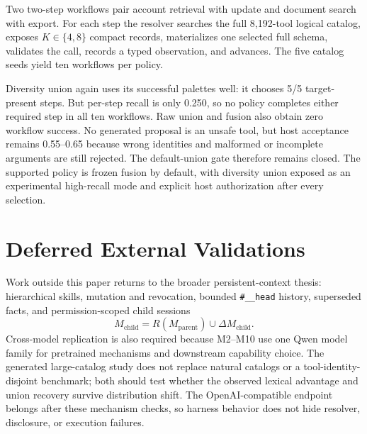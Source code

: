 Two two-step workflows pair account retrieval with update and document search
with export. For each step the resolver searches the full 8,192-tool logical
catalog, exposes $K\in\{4,8\}$ compact records, materializes one selected full
schema, validates the call, records a typed observation, and advances. The
five catalog seeds yield ten workflows per policy.

\begin{table}[H]
\centering
\scriptsize
\resizebox{\linewidth}{!}{}
\caption{Large-catalog two-step JIT at $K=8$. Conditional choice can be high
while workflow success remains zero when a required step is absent from the
palette.}
\label{tab:m10-jit}
\end{table}

Diversity union again uses its successful palettes well: it chooses 5/5
target-present steps. But per-step recall is only 0.250, so no policy completes
either required step in all ten workflows. Raw union and fusion also obtain
zero workflow success. No generated proposal is an unsafe tool, but host
acceptance remains 0.55--0.65 because wrong identities and malformed or
incomplete arguments are still rejected. The default-union gate therefore
remains closed. The supported policy is frozen fusion by default, with
diversity union exposed as an experimental high-recall mode and explicit host
authorization after every selection.

\section{Deferred External Validations}
Work outside this paper returns to the broader persistent-context thesis: hierarchical
skills, mutation and revocation, bounded \texttt{\#\_\_head} history,
superseded facts, and permission-scoped child sessions
\[
M_{\mathrm{child}}=R(M_{\mathrm{parent}})\cup\Delta M_{\mathrm{child}}.
\]
Cross-model replication is also required because M2--M10 use one Qwen model
family for pretrained mechanisms and downstream capability choice. The
generated large-catalog study does not replace natural catalogs or a
tool-identity-disjoint benchmark;
both should test whether the observed lexical advantage and union recovery
survive distribution shift. The OpenAI-compatible endpoint belongs after these
mechanism checks, so harness behavior does not hide resolver, disclosure, or
execution failures.

